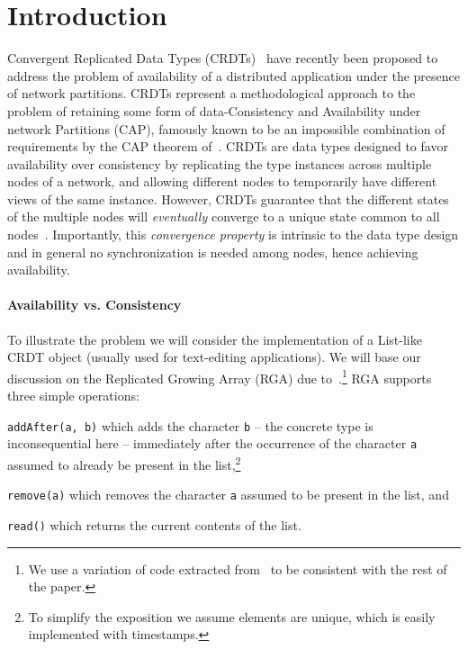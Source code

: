\section{Introduction}
\label{sec:introduction}

Convergent Replicated Data Types (CRDTs)~\cite{ShapiroPBZ11} have
recently been proposed to address the problem of availability of a
distributed application under the presence of network partitions.
%
CRDTs represent a methodological approach to the problem of retaining
some form of data-Consistency and Availability under network Partitions (CAP),
famously known to be an impossible combination of requirements by the
CAP theorem of~\citet{GilbertL02}.
%
CRDTs are data types designed to favor availability over consistency
by replicating the type instances across multiple nodes of a
network, and allowing different nodes to temporarily have different
views of the same instance.
%
However, CRDTs guarantee that the different states of the multiple
nodes will \emph{eventually} converge to a unique state common to all
nodes~\cite{ShapiroPBZ11,Burckhardt14}.
%
Importantly, this \emph{convergence property} is intrinsic to the data
type design and in general no synchronization is needed among nodes,
hence achieving availability.

\paragraph{Availability vs. Consistency}
To illustrate the problem we will consider the implementation of a
List-like CRDT object (usually used for text-editing applications).
%
We will base our discussion on the Replicated Growing Array (RGA) due
to~\cite{RohJKL11}.\footnote{We use a variation of code extracted
  from~\cite{ShapiroPBZ11} to be consistent with the rest of the
  paper.}
%
RGA supports three simple operations:
\begin{inparaenum}
\item \lstinline|addAfter(a, b)| which adds the character
  \lstinline|b| -- the concrete type is inconsequential here --
  immediately after the occurrence of the character \lstinline|a|
  assumed to already be present in the list,\footnote{To simplify the
    exposition we assume elements are unique, which is easily implemented
    with timestamps.}
\item \lstinline|remove(a)| which removes the character \lstinline|a|
  assumed to be present in the list, and
\item \lstinline|read()| which returns the current contents of the
  list.
\end{inparaenum}

